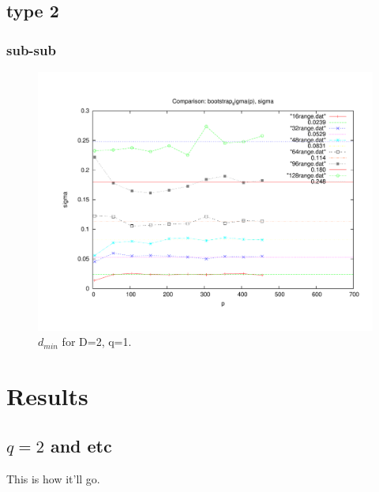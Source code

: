 \documentclass[aps, twocolumn, groupedaddress]{revtex4}
\begin{document}
\subsection{type 2}
\label{sec-2.2}
\subsubsection{sub-sub}
\label{sec-2.2.1}

\begin{figure}[htp]
\centering
\includegraphics[width=.85\textwidth]{boot}
\caption{$d_{min}$ for D=2, q=1.}\label{fig:1}
\end{figure}
\section{Results}
\label{sec-3}
\subsection{$q=2$ and etc}
\label{sec-3.1}

This is how it'll go.



\end{document}
